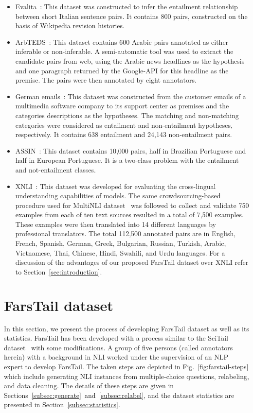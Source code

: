 \documentclass[preprint,12pt]{elsarticle}
\begin{document}
\begin{itemize}
    \item Evalita~\citep{bos2009textual}: This dataset was constructed to infer the entailment relationship between short Italian sentence pairs. It contains 800 pairs, constructed on the basis of Wikipedia revision histories. 
    \item ArbTEDS~\citep{alabbas2013dataset}: This dataset contains 600 Arabic pairs annotated as either inferable or non-inferable. A semi-automatic tool was used to extract the candidate pairs from web, using the Arabic news headlines as the hypothesis and one paragraph returned by the Google-API for this headline as the premise. The pairs were then annotated by eight annotators. 
    \item German emails~\citep{eichler2014analysis}:  This dataset was constructed from the customer emails of a multimedia software company to its support center as premises and the categories descriptions as the hypotheses. The matching and non-matching categories were considered as entailment and non-entailment hypotheses, respectively. It contains 638 entailment and 24,143 non-entailment pairs. 
    \item ASSIN~\citep{fonseca2016overview}: This dataset contains 10,000 pairs, half in Brazilian Portuguese and half in European Portuguese. It is a two-class problem with the entailment and not-entailment classes. 
    \item XNLI~\citep{conneau2018xnli}: This dataset was developed for evaluating the cross-lingual understanding capabilities of models. The same crowdsourcing-based procedure used for MultiNLI dataset~\citep{williams2017broad} was followed to collect and validate 750 examples from each of ten text sources resulted in a total of 7,500 examples. These examples were then translated into 14 different languages by professional translators. The total 112,500 annotated pairs are in English, French, Spanish, German, Greek, Bulgarian, Russian, Turkish, Arabic, Vietnamese, Thai, Chinese, Hindi, Swahili, and Urdu languages. For a discussion of the advantages of our proposed FarsTail dataset over XNLI refer to Section~\ref{sec:introduction}.
\end{itemize}

\section{FarsTail dataset}
\label{sec:farstail}
In this section, we present the process of developing FarsTail dataset as well as its statistics. FarsTail has been developed with a process similar to the SciTail dataset~\citep{khot2018scitail} with some modifications. A group of five persons (called annotators herein) with a background in NLI worked under the supervision of an NLP expert to develop FarsTail. The taken steps are depicted in Fig.~\ref{fig:farstail-steps} which include generating NLI instances from multiple-choice questions, relabeling, and data cleaning. The details of these steps are given in Sections~\ref{subsec:generate}~and~\ref{subsec:relabel}, and the dataset statistics are presented in Section~\ref{subsec:statistics}. 
\end{document}

